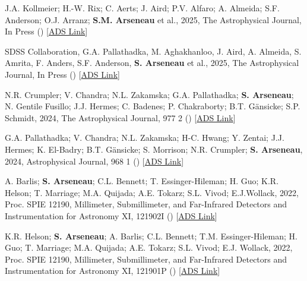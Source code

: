 \documentclass[12pt,letterpaper]{article}
\begin{document}
\begin{list}{}{\cvlist}
  \item[{\color{numcolor}\scriptsize6}] J.A. Kollmeier; H.-W. Rix; C. Aerts; J. Aird; P.V. Alfaro; A. Almeida; S.F. Anderson; O.J. Arranz; \textbf{S.M. Arseneau} et al., 2025,  The Astrophysical Journal, In Press () [\href{https://ui.adsabs.harvard.edu/abs/2025arXiv250706989K}{ADS Link}]
  
  \item[{\color{numcolor}\scriptsize5}] SDSS Collaboration, G.A. Pallathadka, M. Aghakhanloo, J. Aird, A. Almeida, S. Amrita, F. Anders, S.F. Anderson, \textbf{S. Arseneau} et al., 2025,  The Astrophysical Journal, In Press () [\href{https://ui.adsabs.harvard.edu/abs/2025arXiv250707093S}{ADS Link}]
  
  \item[{\color{numcolor}\scriptsize4}] N.R. Crumpler; V. Chandra; N.L. Zakamska; G.A. Pallathadka; \textbf{S. Arseneau}; N. Gentile Fusillo; J.J. Hermes; C. Badenes; P. Chakraborty; B.T. Gänsicke; S.P. Schmidt, 2024,  The Astrophysical Journal, 977 2 () [\href{https://ui.adsabs.harvard.edu/abs/2024ApJ...977..237C}{ADS Link}]
  
  \item[{\color{numcolor}\scriptsize3}]  G.A. Pallathadka; V. Chandra; N.L. Zakamska; H-C. Hwang; Y. Zentai; J.J. Hermes; K. El-Badry; B.T. G\"ansicke; S. Morrison; N.R. Crumpler; \textbf{S. Arseneau}, 2024,  Astrophysical Journal, 968 1 () [\href{https://ui.adsabs.harvard.edu/abs/2024ApJ...968...42A}{ADS Link}]
  
  \item[{\color{numcolor}\scriptsize2}] A. Barlis; \textbf{S. Arseneau}; C.L. Bennett; T. Essinger-Hileman; H. Guo; K.R. Helson; T. Marriage; M.A. Quijada; A.E. Tokarz; S.L. Vivod; E.J.Wollack, 2022,  Proc. SPIE 12190, Millimeter, Submillimeter, and Far-Infrared Detectors and Instrumentation for Astronomy XI, 121902I () [\href{https://ui.adsabs.harvard.edu/abs/2022SPIE12190E..2IB}{ADS Link}]

  \item[{\color{numcolor}\scriptsize1}] K.R. Helson; \textbf{S. Arseneau}; A. Barlis; C.L. Bennett; T.M. Essinger-Hileman; H. Guo; T. Marriage; M.A. Quijada; A.E. Tokarz; S.L. Vivod; E.J. Wollack, 2022,  Proc. SPIE 12190, Millimeter, Submillimeter, and Far-Infrared Detectors and Instrumentation for Astronomy XI, 121901P () [\href{https://ui.adsabs.harvard.edu/abs/2022SPIE12190E..1PH}{ADS Link}]
\end{list}
\end{document}
